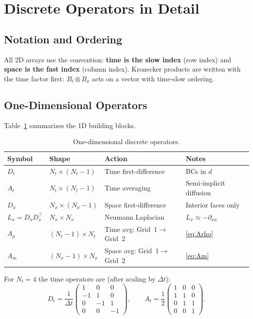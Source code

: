 \documentclass[11pt]{article}
\begin{document}
\section{Discrete Operators in Detail}

\subsection{Notation and Ordering}

All 2D arrays use the convention: \textbf{time is the slow index} (row
index) and \textbf{space is the fast index} (column index).  Kronecker
products are written with the time factor first:
$B_t \otimes B_x$ acts on a vector with time-slow ordering.

\subsection{One-Dimensional Operators}

Table~\ref{tab:operators} summarizes the 1D building blocks.

\begin{table}[h]
\centering
\caption{One-dimensional discrete operators.}
\label{tab:operators}
\begin{tabular}{llll}
\toprule
Symbol & Shape & Action & Notes \\
\midrule
$D_t$ & $N_t \times (N_t-1)$ & Time first-difference & BCs in $d$ \\
$A_t$ & $N_t \times (N_t-1)$ & Time averaging & Semi-implicit diffusion \\
$D_x$ & $N_x \times (N_x-1)$ & Space first-difference & Interior faces only \\
$L_x = D_x D_x^\top$ & $N_x \times N_x$ & Neumann Laplacian & $L_x \approx -\partial_{xx}$ \\
$A_\rho$ & $(N_t-1) \times N_t$ & Time avg: Grid~1$\to$Grid~2 & \eqref{eq:Arho} \\
$A_m$   & $(N_x-1) \times N_x$ & Space avg: Grid~1$\to$Grid~2 & \eqref{eq:Am} \\
\bottomrule
\end{tabular}
\end{table}

For $N_t = 4$ the time operators are (after scaling by $\Delta t$):
\[
  D_t = \frac{1}{\Delta t}\begin{pmatrix}
    1 &  0 &  0 \\
   -1 &  1 &  0 \\
    0 & -1 &  1 \\
    0 &  0 & -1
  \end{pmatrix},
  \qquad
  A_t = \frac{1}{2}\begin{pmatrix}
    1 & 0 & 0 \\
    1 & 1 & 0 \\
    0 & 1 & 1 \\
    0 & 0 & 1
  \end{pmatrix}.
\]
\end{document}
